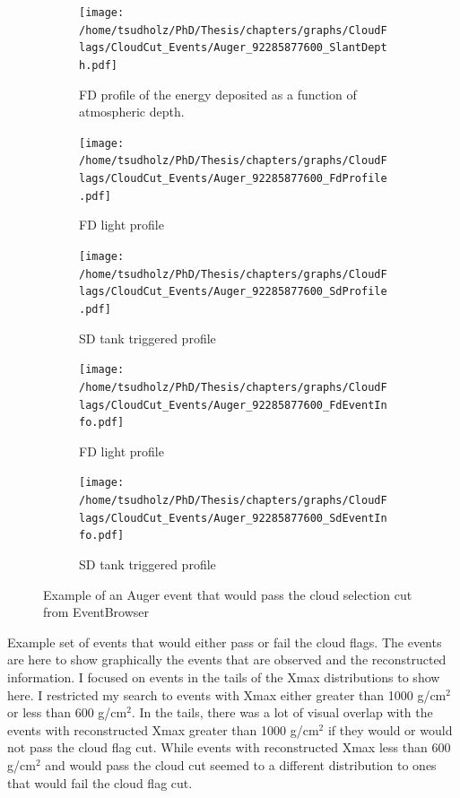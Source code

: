 \begin{figure}[h]
\centering
 \vspace{2cm}
  \begin{subfigure}[b]{\textwidth}
  \centering
  \texttt{[image: /home/tsudholz/PhD/Thesis/chapters/graphs/CloudFlags/CloudCut\_Events/Auger\_92285877600\_SlantDepth.pdf]}
  \caption{FD profile of the energy deposited as a function of atmospheric depth.}
  \end{subfigure}
 \vspace{0.5cm}
  \begin{subfigure}[b]{0.45\textwidth}
  	\centering
  	\texttt{[image: /home/tsudholz/PhD/Thesis/chapters/graphs/CloudFlags/CloudCut\_Events/Auger\_92285877600\_FdProfile.pdf]}
  	\caption{FD light profile}
  \end{subfigure}
  \begin{subfigure}[b]{0.45\textwidth}
  	\centering
  	\texttt{[image: /home/tsudholz/PhD/Thesis/chapters/graphs/CloudFlags/CloudCut\_Events/Auger\_92285877600\_SdProfile.pdf]}
  	\caption{SD tank triggered profile}
  \end{subfigure}

  \begin{subfigure}[b]{0.45\textwidth}
  	\centering
	\texttt{[image: /home/tsudholz/PhD/Thesis/chapters/graphs/CloudFlags/CloudCut\_Events/Auger\_92285877600\_FdEventInfo.pdf]}
  	\caption{FD light profile}
  \end{subfigure}
  \begin{subfigure}[b]{0.45\textwidth}
  	\centering
	\texttt{[image: /home/tsudholz/PhD/Thesis/chapters/graphs/CloudFlags/CloudCut\_Events/Auger\_92285877600\_SdEventInfo.pdf]}
  	\caption{SD tank triggered profile}
  \end{subfigure}
  \caption{Example of an Auger event that would pass the cloud selection cut from EventBrowser}
\end{figure}


Example set of events that would either pass or fail the cloud flags. The events are here to show graphically the events that are observed and the reconstructed information. I focused on events in the tails of the Xmax distributions to show here. I restricted my search to events with Xmax either greater than 1000 g/cm$^{2}$ or less than 600 g/cm$^{2}$. In the tails, there was a lot of visual overlap with the events with reconstructed Xmax greater than 1000 g/cm$^{2}$ if they would or would not pass the cloud flag cut. While events with reconstructed Xmax less than 600 g/cm$^{2}$ and would pass the cloud cut seemed to a different distribution to ones that would fail the cloud flag cut.

